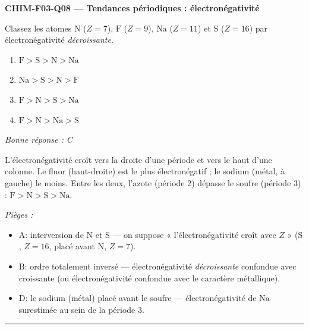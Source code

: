 \documentclass[11pt,a4paper]{article}
\begin{document}
\noindent\textbf{CHIM-F03-Q08 --- Tendances périodiques : électronégativité}\par
Classez les atomes $\mathrm{N}$ ($Z=7$), $\mathrm{F}$ ($Z=9$), $\mathrm{Na}$ ($Z=11$) et $\mathrm{S}$ ($Z=16$) par électronégativité \emph{décroissante}.
\begin{enumerate}[label=\Alph*)]
\item $\mathrm{F} > \mathrm{S} > \mathrm{N} > \mathrm{Na}$
\item $\mathrm{Na} > \mathrm{S} > \mathrm{N} > \mathrm{F}$
\item $\mathrm{F} > \mathrm{N} > \mathrm{S} > \mathrm{Na}$
\item $\mathrm{F} > \mathrm{N} > \mathrm{Na} > \mathrm{S}$
\end{enumerate}
\textit{Bonne réponse : C}\par
L'électronégativité croît vers la droite d'une période et vers le haut d'une colonne. Le fluor (haut-droite) est le plus électronégatif ; le sodium (métal, à gauche) le moins. Entre les deux, l'azote (période 2) dépasse le soufre (période 3) : $\mathrm{F} > \mathrm{N} > \mathrm{S} > \mathrm{Na}$.\par
\textit{Pièges :}
\begin{itemize}
\item A: interversion de N et S --- on suppose « l'électronégativité croît avec $Z$ » ($\mathrm{S}$, $Z=16$, placé avant $\mathrm{N}$, $Z=7$).
\item B: ordre totalement inversé --- électronégativité \emph{décroissante} confondue avec croissante (ou électronégativité confondue avec le caractère métallique).
\item D: le sodium (métal) placé avant le soufre --- électronégativité de $\mathrm{Na}$ surestimée au sein de la période 3.
\end{itemize}
\vspace{8pt}\hrule\vspace{8pt}
\end{document}
